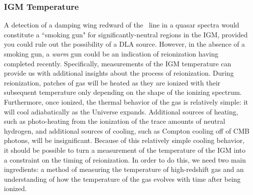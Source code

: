 


\subsubsection{IGM Temperature}\label{sec:IntroIGMTemperature}

A detection of a damping wing redward of the \lya\ line in a quasar spectra would constitute a ``smoking gun" for significantly-neutral regions in the IGM, provided you could rule out the possibility of a DLA source. However, in the absence of a smoking gun, a \textit{warm} gun could be an indication of reionization having completed recently. Specifically, measurements of the IGM temperature can provide us with additional insights about the process of reionization. During reionization, patches of gas will be heated as they are ionized with their subsequent temperature only depending on the shape of the ionizing spectrum. Furthermore, once ionized, the thermal behavior of the gas is relatively simple: it will cool adiabatically as the Universe expands. Additional sources of heating, such as photo-heating from the ionization of the trace amounts of neutral hydrogen, and additional sources of cooling, such as Compton cooling off of CMB photons, will be insignificant. Because of this relatively simple cooling behavior, it should be possible to turn a measurement of the temperature of the IGM into a constraint on the timing of reionization. In order to do this, we need two main ingredients: a method of measuring the temperature of high-redshift gas and an understanding of how the temperature of the gas evolves with time after being ionized. 


